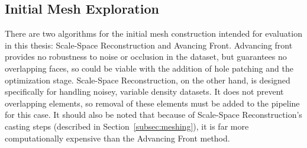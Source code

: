 \documentclass[12pt]{drexelthesis}
\let\Oldsubsection\subsection
\renewcommand{\subsection}{\FloatBarrier\Oldsubsection}
\begin{document}
      
    
      

\subsection{Initial Mesh Exploration}

There are two algorithms for the initial mesh construction intended for evaluation in this thesis: Scale-Space Reconstruction and Avancing Front. Advancing front provides no robustness to noise or occlusion in the dataset, but guarantees no overlapping faces, so could be viable with the addition of hole patching and the optimization stage. Scale-Space Reconstruction, on the other hand, is designed specifically for handling noisey, variable density datasets. It does not prevent overlapping elements, so removal of these elements must be added to the pipeline for this case. It should also be noted that because of Scale-Space Reconstruction's casting steps (described in Section~\ref{subsec:meshing}), it is far more computationally expensive than the Advancing Front method.

	
\end{document}
